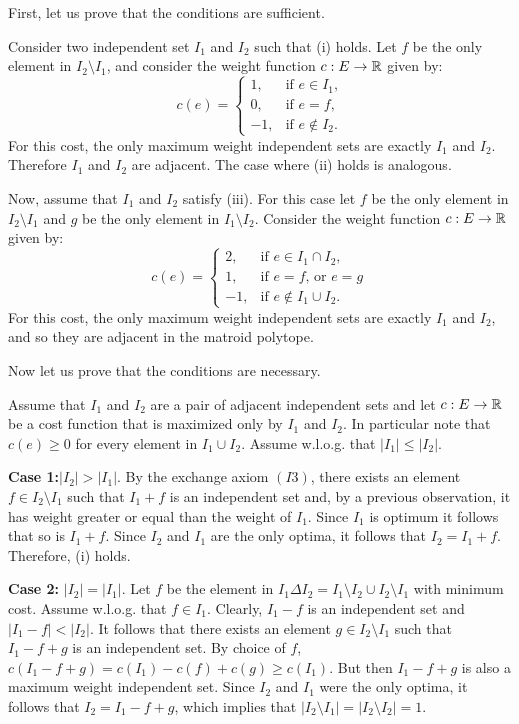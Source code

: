 \documentclass[12pt]{article}
\begin{document}
\begin{enumerate}
First, let us prove that the conditions are sufficient.

Consider two independent set $I_1$ and $I_2$ such that (i) holds. Let $f$ be the only element in $I_2\setminus I_1$, and consider the weight function $c: E \to {\mathbb R}$ given by:
$$c(e)= \begin{cases}
1, &\text{if $e \in I_1$,}\\
0, &\text{if $e=f$,}\\
-1, &\text{if $e \notin I_2$.}
\end{cases}$$
For this cost, the only maximum weight independent sets are exactly $I_1$ and $I_2$. Therefore $I_1$ and $I_2$ are adjacent. The case where (ii) holds is analogous.

Now, assume that $I_1$ and $I_2$ satisfy (iii). For this case let $f$ be the only element in $I_2\setminus I_1$ and $g$ be the only element in $I_1\setminus I_2$. Consider the weight function $c: E \to {\mathbb R}$ given by:
$$c(e)= \begin{cases}
2, &\text{if $e \in I_1 \cap I_2$,}\\
1, &\text{if $e=f$, or $e=g$}\\
-1, &\text{if $e \notin I_1\cup I_2$.}
\end{cases}$$
For this cost, the only maximum weight independent sets are exactly $I_1$ and $I_2$, and so they are adjacent in the matroid polytope.

Now let us prove that the conditions are necessary.

  Assume that $I_1$ and $I_2$ are a pair of adjacent independent sets and let $c: E \to {\mathbb R}$ be a cost function  that is maximized only by $I_1$ and $I_2$. In particular note that $c(e) \geq 0$ for every element in $I_1 \cup I_2$. Assume w.l.o.g. that $|I_1| \leq |I_2|$.

\textbf{Case 1:}$|I_2| > |I_1|$. By the exchange axiom $(I3)$, there exists an element $f \in I_2\setminus I_1$ such that $I_1 + f$ is an independent set and, by a previous observation, it has weight greater or equal than the weight of $I_1$. Since $I_1$ is optimum it follows that so is $I_1 + f$. Since $I_2$ and $I_1$ are the only optima, it follows that $I_2 = I_1 + f$. Therefore, (i) holds.

\textbf{Case 2:} $|I_2| = |I_1|$. Let $f$ be the element in $I_1\Delta I_2 = I_1\setminus I_2 \cup I_2 \setminus I_1$ with minimum cost. Assume w.l.o.g. that $f \in I_1$. Clearly, $I_1 - f$ is an independent set and $|I_1 - f| < |I_2|$. It follows that there exists an element $g \in I_2 \setminus I_1$ such that $I_1 - f + g$ is an independent set. By  choice of $f$, $c(I_1 -f + g) = c(I_1) - c(f) + c(g) \geq c(I_1)$. But then $I_1 - f + g$ is also a maximum weight independent set. Since $I_2$ and $I_1$ were the only optima, it follows that $I_2 = I_1 - f + g$, which implies that $|I_2 \setminus I_1| = |I_2 \setminus I_2| = 1$.


\end{enumerate}
\end{document}
